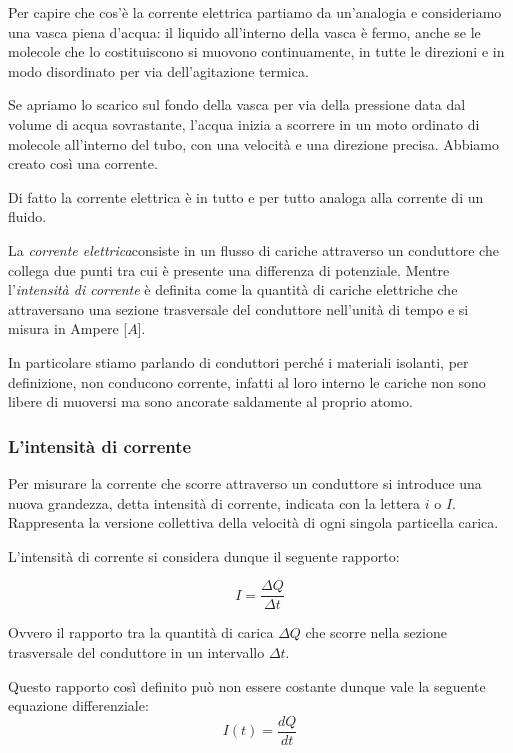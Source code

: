 Per capire che cos’è la corrente elettrica partiamo da un’analogia e consideriamo una vasca piena d’acqua: il liquido all’interno della vasca è fermo, anche se le molecole che lo costituiscono si muovono continuamente, in tutte le direzioni e in modo disordinato per via dell’agitazione termica.

Se apriamo lo scarico sul fondo della vasca per via della pressione data dal volume di acqua sovrastante, l’acqua inizia a scorrere in un moto ordinato di molecole all’interno del tubo, con una velocità e una direzione precisa. Abbiamo creato così una corrente.

Di fatto la corrente elettrica è in tutto e per tutto analoga alla corrente di un fluido.

La \textit{corrente elettrica}consiste in un flusso di cariche attraverso un conduttore che collega due punti tra cui è presente una differenza di potenziale. Mentre l'\textit{intensità di corrente} è definita come la quantità di cariche elettriche che attraversano una sezione trasversale del conduttore nell'unità di tempo e si misura in Ampere [$A$].

In particolare stiamo parlando di conduttori perché i materiali isolanti, per definizione, non conducono corrente, infatti al loro interno le cariche non sono libere di muoversi ma sono ancorate saldamente al proprio atomo.

\subsubsection{L'intensità di corrente}
Per misurare la corrente che scorre attraverso un conduttore si introduce una nuova grandezza, detta intensità di corrente, indicata con la lettera $i$ o $I$.
Rappresenta la versione collettiva della velocità di ogni singola particella carica.

L'intensità di corrente si considera dunque il seguente rapporto:

\begin{equation*}
    I = \frac{\Delta Q}{\Delta t}
\end{equation*}

Ovvero il rapporto tra la quantità di carica $\Delta Q$ che scorre nella sezione trasversale del conduttore in un intervallo $\Delta t$.

Questo rapporto così definito può non essere costante dunque vale la seguente equazione differenziale:
\begin{equation}
    I(t) = \frac{d Q}{d t}
\end{equation}

